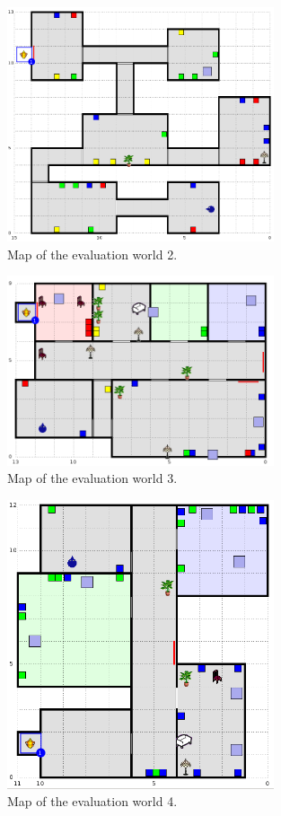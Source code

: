\begin{figure}[!htbp]
  \centering
	\includegraphics[width=0.7\textwidth]{Images/experiment-world-3}
	\caption{Map of the evaluation world 2.}
	\label{fig:exper-world2}
\end{figure}

\begin{figure}[!htbp]
  \centering
	\includegraphics[width=0.7\textwidth]{Images/experiment-world-4}
	\caption{Map of the evaluation world 3.}
	\label{fig:exper-world3}
\end{figure}

\begin{figure}[!htbp]
  \centering
	\includegraphics[width=0.7\textwidth]{Images/experiment-world-5}
	\caption{Map of the evaluation world 4.}
	\label{fig:exper-world4}
\end{figure}


